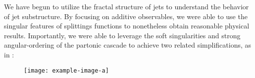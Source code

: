 We have begun to utilize the fractal structure of jets to understand the behavior of jet substructure.
%
By focusing on additive observables, we were able to use the singular features of splittings functions to nonetheless obtain reasonable physical results.
%
Importantly, we were able to leverage the soft singularities and strong angular-ordering of the partonic cascade to achieve two related simplifications, as in :

\begin{figure}[t]
    \centering
    \texttt{[image: example-image-a]}
    \caption[A visualization of the simplifications enabled by additive observables. sam{incomplete}]
    {}
    \label{fig:cascade-simplifications}
\end{figure}

